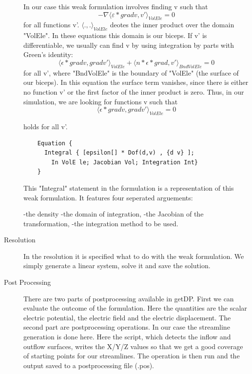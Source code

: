 \documentclass[preprint,journal]{vgtc}       %
\begin{document}
\begin{description}
	In our case this weak formulation involves finding v such that
	\[-\nabla \langle \varepsilon *\mathrel{grad} v, v' \rangle _{VolEle}= 0\]
	for all functions v'. $\langle .,. \rangle _{VolEle}$ deotes the inner product over the domain "VolEle". 
	In these equations this domain is our biceps. 
	If v' is differentiable, we usually can find v by using integration by parts with Green's identity:
	\[\langle \epsilon * \mathrel{grad} v, \mathrel{grad} v' \rangle _{VolEle} + \langle n * \epsilon * \mathrel{grad} , v' \rangle _{BndVolEle} =  0\]
	for all v', where "BndVolEle" is the boundary of "VolEle" (the surface of our biceps). 
	In this equation the surface term vanishes, since there is either no function v' or the first factor of the inner product is zero.
	Thus, in our simulation, we are looking for functions v such that 
	\[
	\langle {\epsilon * \mathrel{grad} {v}, \mathrel{grad} v'} \rangle _{VolEle} =  0
	\]
	
	holds for all v'.
	\begin{verbatim} 
	Equation {
	  Integral { [epsilon[] * Dof(d,v) , {d v} ]; 
	    In VolE le; Jacobian Vol; Integration Int}
	}
	\end{verbatim}
	
	This "Integral" statement in the formulation is a representation of this weak formulation. 
	It features four seperated arguements:
	
	-the density\newline
	-the domain of integration, \newline
	-the Jacobian of the transformation, \newline
	-the integration method to be used.
	
	\item[Resolution]
	In the resolution it is specified what to do with the weak formulation. 
	We simply generate a linear system, solve it and save the solution.  
	\item[Post Processing]
	There are two parts of postprocessing available in getDP. 
	First we can evaluate the outcome of the formulation. 
	Here the quantities are the scalar electric potential, the electric field and the electric displacement.
	The second part are postprocessing operations. 
	In our case the streamline generation is done here. 
	Here the script, which detects the inflow and outflow surfaces, writes the X/Y/Z values so that we get a good coverage of starting points for our streamlines. 
	The operation is then run and the output saved to a postprocessing file (.pos).
	\end{description}
\end{document}
